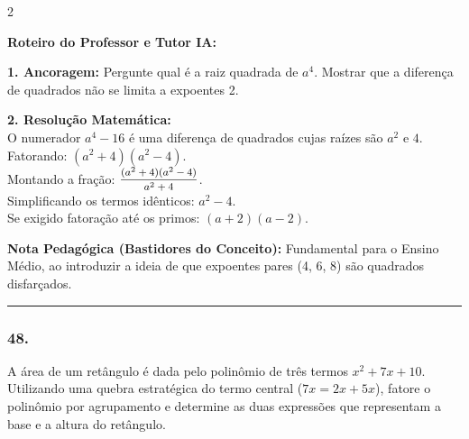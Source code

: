 \begin{multicols*}{2}
\ifgabarito
    \begin{tcolorbox}[colback=CorTitUm!5, colframe=CorTitUm, boxrule=1pt, arc=4pt, left=6pt, right=6pt, top=6pt, bottom=6pt]
    \small\textbf{\textcolor{CorTitUm}{Roteiro do Professor e Tutor IA:}}\par\vspace{0.1cm}
    \color{CinzaEscuro}
    \textbf{1. Ancoragem:} Pergunte qual é a raiz quadrada de $a^4$. Mostrar que a diferença de quadrados não se limita a expoentes 2.\par\vspace{0.1cm}
    \textbf{2. Resolução Matemática:}\\
    O numerador $a^4 - 16$ é uma diferença de quadrados cujas raízes são $a^2$ e $4$.\\
    Fatorando: $(a^2 + 4)(a^2 - 4)$.\\
    Montando a fração: $ \mfrac{(a^2 + 4)(a^2 - 4)}{a^2 + 4} $.\\
    Simplificando os termos idênticos: $a^2 - 4$.\\
    Se exigido fatoração até os primos: $(a + 2)(a - 2)$.
    \end{tcolorbox}
    \vspace{0.15cm}
    
    \begin{boxexplicacao}
    \textbf{Nota Pedagógica (Bastidores do Conceito):} Fundamental para o Ensino Médio, ao introduzir a ideia de que expoentes pares (4, 6, 8) são quadrados disfarçados.
    \end{boxexplicacao}
\fi

\par\vspace{\espacoQuestao}

\noindent\textcolor{CorLinha}{\rule{\linewidth}{0.5pt}} 
\par\vspace{\espacoPreQuestao}
\subsubsection*{48.} 
\begin{enunciadoLiteral}
A área de um retângulo é dada pelo polinômio de três termos $x^2 + 7x + 10$. Utilizando uma quebra estratégica do termo central ($7x = 2x + 5x$), fatore o polinômio por agrupamento e determine as duas expressões que representam a base e a altura do retângulo.
\end{enunciadoLiteral}


\end{multicols*}
